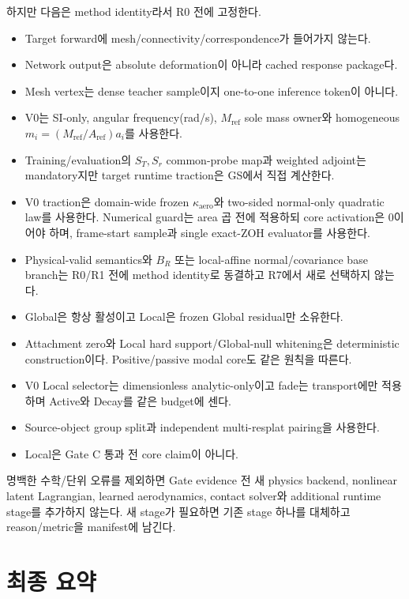 \documentclass[11pt]{article}
\begin{document}
하지만 다음은 method identity라서 R0 전에 고정한다.
\begin{itemize}
  \item Target forward에 mesh/connectivity/correspondence가 들어가지 않는다.
  \item Network output은 absolute deformation이 아니라 cached response package다.
  \item Mesh vertex는 dense teacher sample이지 one-to-one inference token이 아니다.
  \item V0는 SI-only, angular frequency(rad/s), \(M_{\mathrm{ref}}\) sole mass owner와
  homogeneous \(m_i=(M_{\mathrm{ref}}/A_{\mathrm{ref}})a_i\)를 사용한다.
  \item Training/evaluation의 \(S_T,S_r\) common-probe map과 weighted adjoint는 mandatory지만
  target runtime traction은 GS에서 직접 계산한다.
  \item V0 traction은 domain-wide frozen \(\kappa_{\mathrm{aero}}\)와 two-sided normal-only quadratic law를
  사용한다. Numerical guard는 area 곱 전에 적용하되 core activation은 0이어야 하며,
  frame-start sample과 single exact-ZOH evaluator를 사용한다.
  \item Physical-valid semantics와 \(B_R\) 또는 local-affine normal/covariance base branch는
  R0/R1 전에 method identity로 동결하고 R7에서 새로 선택하지 않는다.
  \item Global은 항상 활성이고 Local은 frozen Global residual만 소유한다.
  \item Attachment zero와 Local hard support/Global-null whitening은 deterministic construction이다.
  Positive/passive modal core도 같은 원칙을 따른다.
  \item V0 Local selector는 dimensionless analytic-only이고 fade는 transport에만 적용하며
  Active와 Decay를 같은 budget에 센다.
  \item Source-object group split과 independent multi-resplat pairing을 사용한다.
  \item Local은 Gate C 통과 전 core claim이 아니다.
\end{itemize}

명백한 수학/단위 오류를 제외하면 Gate evidence 전 새 physics backend, nonlinear latent Lagrangian,
learned aerodynamics, contact solver와 additional runtime stage를 추가하지 않는다.
새 stage가 필요하면 기존 stage 하나를 대체하고 reason/metric을 manifest에 남긴다.

\section{최종 요약}
\end{document}
